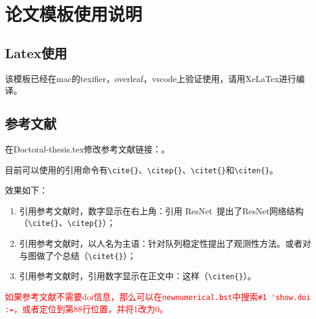 \chapter{论文模板使用说明}
\section{Latex使用}
该模板已经在mac的texifier，overleaf，vscode上验证使用，请用XeLaTex进行编译。



\section{参考文献}

在Doctoral-thesis.tex修改参考文献链接：\lstinline!!。

目前可以使用的引用命令有\lstinline!\cite{}!、\lstinline!\citep{}!、\lstinline!\citet{}!和\lstinline!\citen{}!。

效果如下：
\begin{enumerate}
	\item 引用参考文献时，数字显示在右上角：引用 ResNet~\cite{2020_aradi_Survey}提出了ResNet网络结构\citep{2020_aradi_Survey}（\lstinline!\cite{}!、\lstinline!\citep{}!）；
	\item 引用参考文献时，以人名为主语：\citet{2017_qinxiaohui_FeiYunZhiCheLiangDuiLieDeFenBuShiKongZhi}针对队列稳定性提出了观测性方法。或者\citet{2021_chen_Graph}对与图做了个总结（\lstinline!\citet{}!）；
	\item 引用参考文献时，引用数字显示在正文中：这样（\lstinline!\citen{}!）。
\end{enumerate}

\textcolor{red}{如果参考文献不需要doi信息，那么可以在\lstinline!newnumerical.bst!中搜索\lstinline!#1 'show.doi :=!，或者定位到第88行位置，并将1改为0。}



